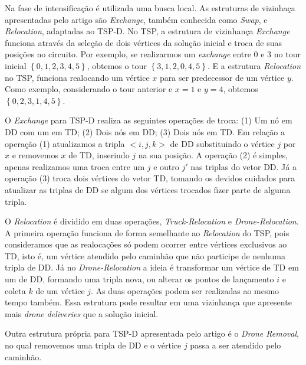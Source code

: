 \documentclass[12pt, a4paper]{article}
\begin{document}

Na fase de intensificação é utilizada uma busca local. As estruturas de vizinhaça apresentadas pelo artigo são \textit{Exchange}, também conhecida como \textit{Swap}, e \textit{Relocation}, adaptadas ao TSP-D. 
No TSP, a estrutura de vizinhança \textit{Exchange} funciona através da seleção de dois vértices da solução inicial e troca de suas posições no circuito. Por exemplo, se realizarmos um \textit{exchange} entre 0 e 3 no tour inicial $\left\{0, 1, 2, 3, 4, 5\right\}$, obtemos o tour $\left\{3, 1, 2, 0, 4, 5\right\}$. 
E a estrutura \textit{Relocation} no TSP, funciona realocando um vértice $x$ para ser predecessor de um vértice $y$. Como exemplo, considerando o tour anterior e $x = 1$ e $y = 4$, obtemos $\left\{0, 2, 3, 1, 4, 5\right\}$.



O \textit{Exchange} para TSP-D realiza as seguintes operações de troca: (1) Um nó em DD com um em TD; (2) Dois nós em DD; (3) Dois nós em TD. Em relação a operação 
(1) atualizamos a tripla ${<}i, j, k{>}$ de DD substituindo o vértice $j$ por $x$ e removemos $x$ de TD, inserindo $j$ na sua posição. A operação (2) é simples, apenas realizamos uma troca entre um $j$ e outro $j'$ nas triplas do vetor DD. Já a operação (3) troca dois vértices do vetor TD, tomando os devidos cuidados para atualizar as triplas de DD se algum dos vértices trocados fizer parte de alguma tripla.



O \textit{Relocation} é dividido em duas operações, \textit{Truck-Relocation} e \textit{Drone-Relocation}. A primeira operação funciona de forma semelhante ao \textit{Relocation} do TSP, pois consideramos que as realocações só podem ocorrer entre vértices exclusivos ao TD, isto é, um vértice atendido pelo caminhão que não participe de nenhuma tripla de DD. Já no \textit{Drone-Relocation} a ideia é transformar um vértice de TD em um de DD, formando uma tripla nova, ou alterar os pontos de lançamento $i$ e coleta $k$ de um vértice $j$. As duas operações podem ser realizadas ao mesmo tempo também. Essa estrutura pode resultar em uma vizinhança que apresente mais \textit{drone deliveries} que a solução inicial.



Outra estrutura própria para TSP-D apresentada pelo artigo é o \textit{Drone Removal}, no qual removemos uma tripla de DD e o vértice $j$ passa a ser atendido pelo caminhão.


\end{document}
